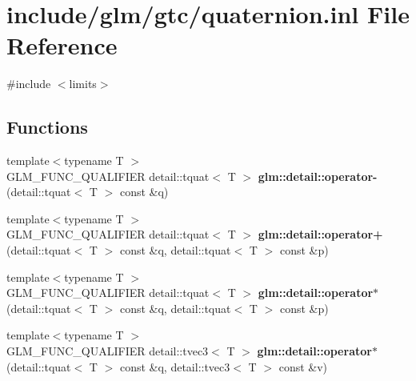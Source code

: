 \hypertarget{glm_2gtc_2quaternion_8inl}{\section{include/glm/gtc/quaternion.inl \-File \-Reference}
\label{glm_2gtc_2quaternion_8inl}
}
{\ttfamily \#include $<$limits$>$}\*
\subsection*{\-Functions}
\begin{DoxyCompactItemize}
\item 
\hypertarget{namespaceglm_1_1detail_a545892ee159f68c5d77e3b6290a745c2}{{\footnotesize template$<$typename T $>$ }\\\-G\-L\-M\-\_\-\-F\-U\-N\-C\-\_\-\-Q\-U\-A\-L\-I\-F\-I\-E\-R \*
detail\-::tquat$<$ \-T $>$ {\bfseries glm\-::detail\-::operator-\/} (detail\-::tquat$<$ \-T $>$ const \&q)}\label{namespaceglm_1_1detail_a545892ee159f68c5d77e3b6290a745c2}

\item 
\hypertarget{namespaceglm_1_1detail_a807262190862c9cb8b7c08f547371831}{{\footnotesize template$<$typename T $>$ }\\\-G\-L\-M\-\_\-\-F\-U\-N\-C\-\_\-\-Q\-U\-A\-L\-I\-F\-I\-E\-R \*
detail\-::tquat$<$ \-T $>$ {\bfseries glm\-::detail\-::operator+} (detail\-::tquat$<$ \-T $>$ const \&q, detail\-::tquat$<$ \-T $>$ const \&p)}\label{namespaceglm_1_1detail_a807262190862c9cb8b7c08f547371831}

\item 
\hypertarget{namespaceglm_1_1detail_a74d820bafaf78ba2185f70dccc368036}{{\footnotesize template$<$typename T $>$ }\\\-G\-L\-M\-\_\-\-F\-U\-N\-C\-\_\-\-Q\-U\-A\-L\-I\-F\-I\-E\-R \*
detail\-::tquat$<$ \-T $>$ {\bfseries glm\-::detail\-::operator$\ast$} (detail\-::tquat$<$ \-T $>$ const \&q, detail\-::tquat$<$ \-T $>$ const \&p)}\label{namespaceglm_1_1detail_a74d820bafaf78ba2185f70dccc368036}

\item 
\hypertarget{namespaceglm_1_1detail_a4c95a8e1aece02bfd9cca3f937c95258}{{\footnotesize template$<$typename T $>$ }\\\-G\-L\-M\-\_\-\-F\-U\-N\-C\-\_\-\-Q\-U\-A\-L\-I\-F\-I\-E\-R \*
detail\-::tvec3$<$ \-T $>$ {\bfseries glm\-::detail\-::operator$\ast$} (detail\-::tquat$<$ \-T $>$ const \&q, detail\-::tvec3$<$ \-T $>$ const \&v)}\label{namespaceglm_1_1detail_a4c95a8e1aece02bfd9cca3f937c95258}


\end{DoxyCompactItemize}

